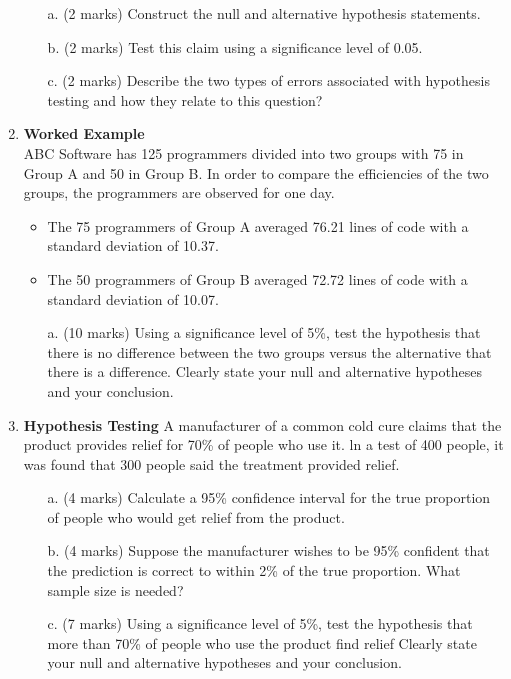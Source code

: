 \documentclass[]{report}
\begin{document}
\begin{enumerate}
	\begin{itemize}
		\item[a.](2 marks) Construct the null and alternative hypothesis statements.
		\item[b.](2 marks) Test this claim using a significance level of 0.05.
		\item[c.](2 marks) Describe the two types of errors associated with hypothesis testing and how
		they relate to this question?
	\end{itemize}
	
	\item \textbf{Worked Example} \\ ABC Software has 125 programmers divided into two groups with 75 in
	Group A and 50 in Group B. In order to compare the efficiencies of the
	two groups, the programmers are observed for one day. \begin{itemize} \item The 75
		programmers of Group A averaged 76.21 lines of code with a standard
		deviation of 10.37. \item The 50 programmers of Group B averaged 72.72
		lines of code with a standard deviation of 10.07. \end{itemize}
	\begin{itemize}
		\item[a.](10 marks) Using a significance
		level of 5\%, test the hypothesis that there is no difference between the
		two groups versus the alternative that there is a difference. Clearly state
		your null and alternative hypotheses and your conclusion.
	\end{itemize}
	
	\item \textbf{Hypothesis Testing}
	A manufacturer of a common cold cure claims that the product provides
	relief for 70\% of people who use it. ln a test of 400 people, it was found
	that 300 people said the treatment provided relief.
	
	\begin{itemize}
		\item[a.](4 marks) Calculate a 95\% confidence interval for the true proportion of
		people who would get relief from the product.
		
		\item[b.](4 marks) Suppose the manufacturer wishes to be 95\% confident that the
		prediction is correct to within 2\% of the true proportion. What
		sample size is needed?
		
		\item[c.](7 marks) Using a significance level of 5\%, test the hypothesis that more than
		70\% of people who use the product find relief Clearly state your
		null and alternative hypotheses and your conclusion.
	\end{itemize}
	

\end{enumerate}
\end{document}
